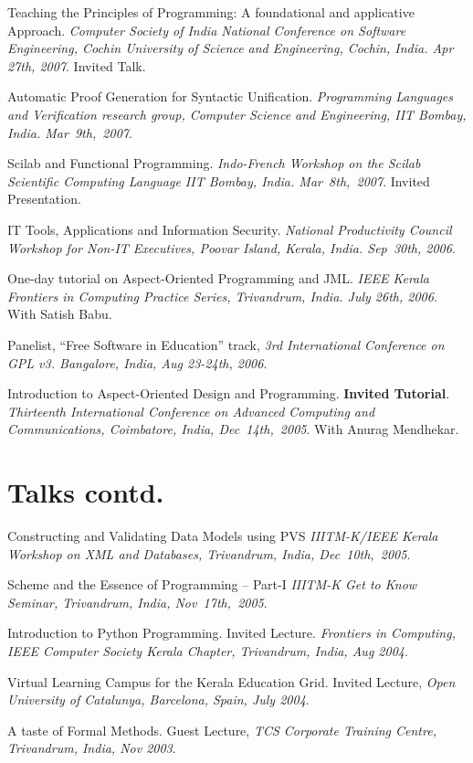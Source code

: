 \documentclass[11pt,margin,line]{res}
\begin{document}
\begin{resume}
Teaching the Principles of Programming: A foundational and
applicative Approach. {\em Computer Society of India
  National Conference on Software Engineering, Cochin
  University of Science and Engineering, Cochin, India.  Apr
  27th, 2007}.  Invited Talk.

Automatic Proof Generation for Syntactic Unification.  {\em
  Programming Languages and Verification research group,
  Computer Science and Engineering, IIT Bombay, India.
  Mar~9th,~2007}.

Scilab and Functional Programming.  {\em Indo-French
  Workshop on the Scilab Scientific Computing Language IIT
  Bombay, India.  Mar~8th,~2007}.  Invited Presentation.

IT Tools, Applications and Information Security.  {\em
National Productivity Council Workshop for Non-IT
Executives, Poovar Island, Kerala, India.  Sep~30th, 2006}.


One-day tutorial on Aspect-Oriented Programming and JML.
{\em IEEE Kerala Frontiers in Computing Practice Series,
Trivandrum, India.  July 26th, 2006}.  With Satish Babu.

Panelist, ``Free Software in Education'' track, {\em 3rd
International Conference on GPL v3.  Bangalore, India, Aug
23-24th, 2006}.

Introduction to Aspect-Oriented Design and Programming.
{\bf Invited Tutorial}.  {\em Thirteenth International
Conference on Advanced Computing and Communications,
Coimbatore, India, Dec~14th,~2005}.  With Anurag Mendhekar.

\newpage

\section{\sc Talks contd.}

Constructing and Validating Data Models using PVS {\em
IIITM-K/IEEE Kerala Workshop on XML and Databases,
Trivandrum, India, Dec~10th,~2005}.

Scheme and the Essence of Programming -- Part-I {\em IIITM-K
Get to Know Seminar, Trivandrum, India, Nov~17th,~2005}.

Introduction to Python Programming.  Invited Lecture.  {\em
Frontiers in Computing, IEEE Computer Society Kerala
Chapter, Trivandrum, India, Aug 2004}.

Virtual Learning Campus for the Kerala Education Grid.
Invited Lecture, {\em Open University of Catalunya,
Barcelona, Spain, July 2004}.

A taste of Formal Methods.  Guest Lecture, {\em {TCS Corporate
Training Centre,  Trivandrum,  India, Nov 2003}}. 



\end{resume}
\end{document}
